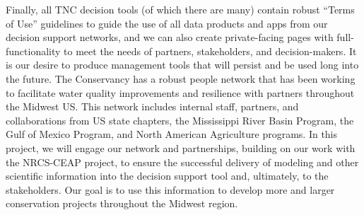 \documentclass[12pt, class=article, crop=false]{standalone}
\begin{document}
Finally, all TNC decision tools (of which there are many) contain robust ``Terms of Use'' guidelines to guide the use of all data products and apps from our decision support networks, and we can also create private-facing pages with full-functionality to meet the needs of partners, stakeholders, and decision-makers.
It is our desire to produce management tools that will persist and be used long into the future.
The Conservancy has a robust people network that has been working to facilitate water quality improvements and resilience with partners throughout the Midwest US.
This network includes internal staff, partners, and collaborations from US state chapters, the Mississippi River Basin Program, the Gulf of Mexico Program, and North American Agriculture programs.
In this project, we will engage our network and partnerships, building on our work with the NRCS-CEAP project, to ensure the successful delivery of modeling and other scientific information into the decision support tool and, ultimately, to the stakeholders.
Our goal is to use this information to develop more and larger conservation projects throughout the Midwest region.
\end{document}
